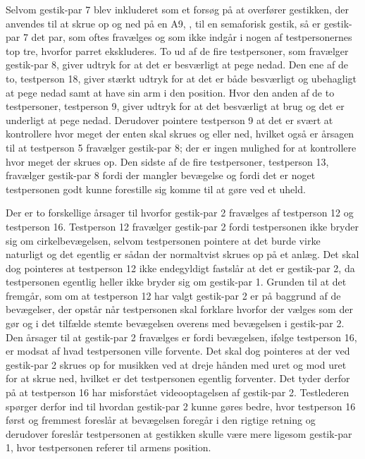 Selvom gestik-par 7 blev inkluderet som et forsøg på at overfører gestikken, der anvendes til at skrue op og ned på en A9, \parencite{WEB:BeoplayA9}, til en semaforisk gestik, så er gestik-par 7 det par, som oftes fravælges og som ikke indgår i nogen af testpersonernes top tre, hvorfor parret ekskluderes.\blankline
%
To ud af de fire testpersoner, som fravælger gestik-par 8, giver udtryk for at det er besværligt at pege nedad. Den ene af de to, testperson 18, giver stærkt udtryk for at det er både besværligt og ubehagligt at pege nedad samt at have sin arm i den position. Hvor den anden af de to testpersoner, testperson 9, giver udtryk for at det besværligt at brug og det er underligt at pege nedad. Derudover pointere testperson 9 at det er svært at kontrollere hvor meget der enten skal skrues og eller ned, hvilket også er årsagen til at testperson 5 fravælger gestik-par 8; der er ingen mulighed for at kontrollere hvor meget der skrues op. Den sidste af de fire testpersoner, testperson 13, fravælger gestik-par 8 fordi der mangler bevægelse og fordi det er noget testpersonen godt kunne forestille sig komme til at gøre ved et uheld.  

Der er to forskellige årsager til hvorfor gestik-par 2 fravælges af testperson 12 og testperson 16. Testperson 12 fravælger gestik-par 2 fordi testpersonen ikke bryder sig om cirkelbevægelsen, selvom testpersonen pointere at det burde virke naturligt og det egentlig er sådan der normaltvist skrues op på et anlæg. Det skal dog pointeres at testperson 12 ikke endegyldigt fastslår at det er gestik-par 2, da testpersonen egentlig heller ikke bryder sig om gestik-par 1. Grunden til at det fremgår, som om at testperson 12 har valgt gestik-par 2 er på baggrund af de bevægelser, der opstår når testpersonen skal forklare hvorfor der vælges som der gør og i det tilfælde stemte bevægelsen overens med bevægelsen i gestik-par 2. Den årsager til at gestik-par 2 fravælges er fordi bevægelsen, ifølge testperson 16, er modsat af hvad testpersonen ville forvente. Det skal dog pointeres at der ved gestik-par 2 skrues op for musikken ved at dreje hånden med uret og mod uret for at skrue ned, hvilket er det testpersonen egentlig forventer. Det tyder derfor på at testperson 16 har misforstået videooptagelsen af gestik-par 2. Testlederen spørger derfor ind til hvordan gestik-par 2 kunne gøres bedre, hvor testperson 16 først og fremmest foreslår at bevægelsen foregår i den rigtige retning og derudover foreslår testpersonen at gestikken skulle være mere ligesom gestik-par 1, hvor testpersonen referer til armens position.  

